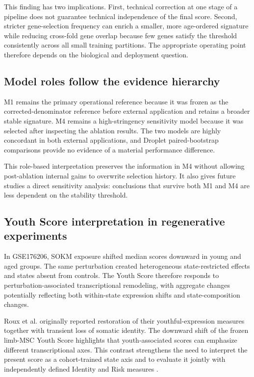 \documentclass[10pt,twocolumn]{article}
\begin{document}
This finding has two implications. First, technical correction at one stage of a pipeline does not guarantee technical independence of the final score. Second, stricter gene-selection frequency can enrich a smaller, more age-ordered signature while reducing cross-fold gene overlap because few genes satisfy the threshold consistently across all small training partitions. The appropriate operating point therefore depends on the biological and deployment question.

\subsection{Model roles follow the evidence hierarchy}\label{model-roles-follow-the-evidence-hierarchy}

M1 remains the primary operational reference because it was frozen as the corrected-denominator reference before external application and retains a broader stable signature. M4 remains a high-stringency sensitivity model because it was selected after inspecting the ablation results. The two models are highly concordant in both external applications, and Droplet paired-bootstrap comparisons provide no evidence of a material performance difference.

This role-based interpretation preserves the information in M4 without allowing post-ablation internal gains to overwrite selection history. It also gives future studies a direct sensitivity analysis: conclusions that survive both M1 and M4 are less dependent on the stability threshold.

\subsection{Youth Score interpretation in regenerative experiments}\label{youth-score-interpretation-in-regenerative-experiments}

In GSE176206, SOKM exposure shifted median scores downward in young and aged groups. The same perturbation created heterogeneous state-restricted effects and states absent from controls. The Youth Score therefore responds to perturbation-associated transcriptional remodeling, with aggregate changes potentially reflecting both within-state expression shifts and state-composition changes.

Roux et al. originally reported restoration of their youthful-expression measures together with transient loss of somatic identity. The downward shift of the frozen limb-MSC Youth Score highlights that youth-associated scores can emphasize different transcriptional axes. This contrast strengthens the need to interpret the present score as a cohort-trained state axis and to evaluate it jointly with independently defined Identity and Risk measures \citep{roux2022}.
\end{document}
